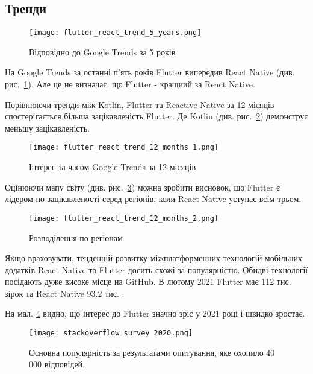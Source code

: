 \subsection{Тренди}
\label{subsec:mobile_trends}

\begin{figure}
    \texttt{[image: flutter\_react\_trend\_5\_years.png]}
    \caption{Відповідно до Google Trends за 5 років}
    \label{fig:flutter_react_trend_5_years}
\end{figure}

На Google Trends за останні п’ять років Flutter випередив React Native (див. рис.~\ref{fig:flutter_react_trend_5_years}).
Але це не визначає, що Flutter - кращиий за React Native.

Порівнюючи тренди між Kotlin, Flutter та Reactive Native за 12 місяців спостерігається більша зацікавленість Flutter.
Де Kotlin (див. рис.~\ref{fig:flutter_react_trend_12_months_1}) демонструє меньшу зацікавленість.
\begin{figure}
    \texttt{[image: flutter\_react\_trend\_12\_months\_1.png]}
    \caption{Інтерес за часом Google Trends за 12 місяців \cite{google_trends}}
    \label{fig:flutter_react_trend_12_months_1}
\end{figure}

Оцінюючи мапу світу (див. рис.~\ref{fig:flutter_react_trend_12_months_2}) можна зробити висновок,
що Flutter є лідером по зацікавленості серед регіонів, коли React Native уступає всім трьом.

\begin{figure}
    \texttt{[image: flutter\_react\_trend\_12\_months\_2.png]}
    \caption{Розподілення по регіонам \cite{google_trends}}
    \label{fig:flutter_react_trend_12_months_2}
\end{figure}

Якщо враховувати, тенденцій розвитку міжплатформенних технологій мобільних додатків React Native та Flutter досить схожі за популярністю.
Обидві технології посідають дуже високе місце на GitHub.
В лютому 2021 Flutter має 112 тис. зірок \cite{flutter_gihtub} та React Native 93.2 тис. \cite{rn_gihtub}.

На мал. \ref{fig:stackoverflow_survey_2020} видно, що інтерес до Flutter значно зріс у 2021 році і швидко зростає.

\begin{figure}
    \begin{center}
        \texttt{[image: stackoverflow\_survey\_2020.png]}
    \end{center}
    \caption{Основна популярність за результатами опитування, яке охопило 40 000 відповідей. \cite{stackoverflow_survey_2020}}
    \label{fig:stackoverflow_survey_2020}
\end{figure}

